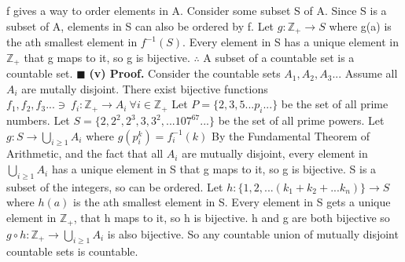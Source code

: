 \documentclass[12pt]{article}
\begin{document}
	f gives a way to order elements in A. \newline
	Consider some subset S of A. Since S is a subset of A, elements in S can also be ordered by f. \newline \newline
	Let \(g: \mathbb{Z}_+ \rightarrow S\) where g(a) is the ath smallest element in \(f^{-1}(S)\). \newline
	Every element in S has a unique element in \(\mathbb{Z}_+\) that g maps to it, so g is bijective. \newline
	\(\therefore\) A subset of a countable set is a countable set.
	\newline \(\blacksquare\) \newline \newline
	\textbf{(v) Proof.} Consider the countable sets \(A_1,A_2,A_3...\)
	\newline
	Assume all \(A_i\) are mutally disjoint.
	\newline \newline
	There exist bijective functions \(f_1,f_2,f_3... \ni\ f_i: \mathbb{Z}_+ \rightarrow A_i\ \forall i \in \mathbb{Z}_+\)
	\newline
	\newline
	Let \(P = \{2,3,5...p_i...\}\) be the set of all prime numbers.
	\newline
	Let \(S = \{2, 2^2, 2^3, 3, 3^2,...107^{67}...\}\) be the set of all prime powers. \newline \newline
	Let \(g: S \rightarrow \bigcup_{i \geq 1} A_i\) where \(g(p_i^k)=f^{-1}_i(k)\) \newline
	By the Fundamental Theorem of Arithmetic, and the fact that all \(A_i\) are mutually disjoint, every element in \(\bigcup_{i \geq 1} A_i\) has a unique element in S that g maps to it, so g is bijective. \newline \newline
	S is a subset of the integers, so can be ordered.
	\newline
	Let \(h: \{1,2,...(k_1+k_2+...k_n)\} \rightarrow S\) where \(h(a)\) is the ath smallest element in S.
	\newline
	Every element in S gets a unique element in \(\mathbb{Z}_+\), that h maps to it, so h is bijective.
	\newline \newline
	h and g are both bijective so \(g \circ h : \mathbb{Z}_+ \rightarrow \bigcup_{i \geq 1} A_i\) is also bijective.
	\newline So any countable union of mutually disjoint countable sets is countable.
\end{document}
